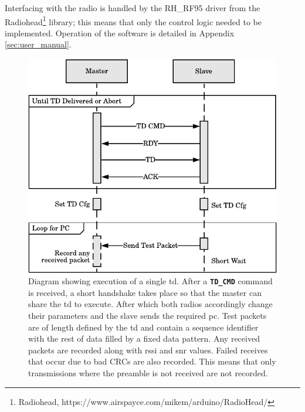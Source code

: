 Interfacing with the radio is handled by the RH\_RF95 driver from the Radiohead\footnote{Radiohead, https://www.airspayce.com/mikem/arduino/RadioHead/} library; this means that only the control logic needed to be implemented. Operation of the software is detailed in Appendix \ref{sec:user_manual}.

\begin{figure}[H]
    \centering
    \includegraphics{Figures/software_testdef_execution.pdf}
    \caption[Master-Slave test definition execution method]{
    	Diagram showing execution of a single \ac{td}. After a \textbf{\texttt{TD\_CMD}} command is received, a short handshake takes place so that the master can share the \ac{td} to execute. After which both radios accordingly change their parameters and the slave sends the required \ac{pc}. Test packets are of length defined by the \ac{td} and contain a sequence identifier with the rest of data filled by a fixed data pattern. Any received packets are recorded along with \ac{rssi} and \ac{snr} values. Failed receives that occur due to bad CRCs are also recorded. This means that only transmissions where the preamble is not received are not recorded.
    }
    \label{fig:software_testdef_execution}
\end{figure}
